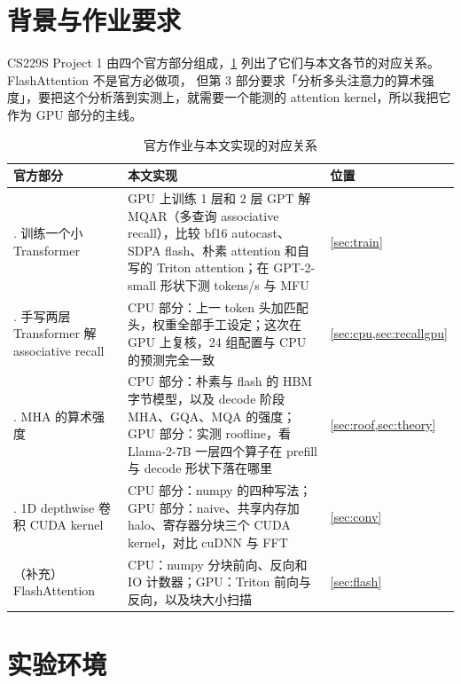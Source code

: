 \documentclass[11pt,a4paper]{ctexart}
\begin{document}
\section{背景与作业要求}

CS229S Project 1 由四个官方部分组成，\cref{tab:map} 列出了它们与本文各节的对应关系。FlashAttention 不是官方必做项，
但第 3 部分要求「分析多头注意力的算术强度」，要把这个分析落到实测上，就需要一个能测的 attention kernel，所以我把它作为 GPU 部分的主线。

\begin{table}[H]
\centering\small
\caption{官方作业与本文实现的对应关系}\label{tab:map}
\begin{tabularx}{\linewidth}{>{\raggedright\arraybackslash}p{3.2cm}>{\raggedright\arraybackslash}X>{\raggedright\arraybackslash}p{3.6cm}}
\toprule
官方部分 & 本文实现 & 位置 \\
\midrule
1. 训练一个小 Transformer & GPU 上训练 1 层和 2 层 GPT 解 MQAR（多查询 associative recall），比较 bf16 autocast、SDPA flash、朴素 attention 和自写的 Triton attention；在 GPT-2-small 形状下测 tokens/s 与 MFU & \cref{sec:train} \\
2. 手写两层 Transformer 解 associative recall & CPU 部分：上一 token 头加匹配头，权重全部手工设定；这次在 GPU 上复核，24 组配置与 CPU 的预测完全一致 & \cref{sec:cpu,sec:recallgpu} \\
3. MHA 的算术强度 & CPU 部分：朴素与 flash 的 HBM 字节模型，以及 decode 阶段 MHA、GQA、MQA 的强度；GPU 部分：实测 roofline，看 Llama-2-7B 一层四个算子在 prefill 与 decode 形状下落在哪里 & \cref{sec:roof,sec:theory} \\
4. 1D depthwise 卷积 CUDA kernel & CPU 部分：numpy 的四种写法；GPU 部分：naive、共享内存加 halo、寄存器分块三个 CUDA kernel，对比 cuDNN 与 FFT & \cref{sec:conv} \\
（补充）FlashAttention & CPU：numpy 分块前向、反向和 IO 计数器；GPU：Triton 前向与反向，以及块大小扫描 & \cref{sec:flash} \\
\bottomrule
\end{tabularx}
\end{table}

\section{实验环境}
\end{document}
